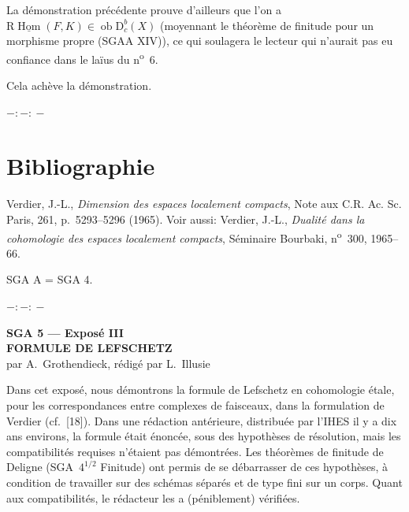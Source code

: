 \documentclass[11pt]{article}
\DeclareMathOperator{\Hom}{Hom}
\newcommand{\R}{\mathrm{R}}
\newcommand{\D}{\mathrm{D}}
\newcommand{\ob}{\operatorname{ob}}
\providecommand{\Hom}{\operatorname{Hom}}
\providecommand{\ob}{\operatorname{ob}}
\providecommand{\R}{\mathrm R}
\providecommand{\Hom}{\operatorname{Hom}}
\begin{document}
La démonstration précédente prouve d'ailleurs que l'on a $\R\underline{\Hom}(F,K)\in\ob\D_c^b(X)$ (moyennant le théorème de finitude pour un morphisme propre (SGAA XIV)), ce qui soulagera le lecteur qui n'aurait pas eu confiance dans le laïus du n\textsuperscript{o}~6.

Cela achève la démonstration.

\begin{center}
$-:\!-:\!-$
\end{center}

\section*{Bibliographie}

\begin{enumerate}[label={[\arabic*]}]
\item Verdier, J.-L., \emph{Dimension des espaces localement compacts}, Note aux C.R. Ac. Sc. Paris, 261, p.~5293--5296 (1965). Voir aussi: Verdier, J.-L., \emph{Dualité dans la cohomologie des espaces localement compacts}, Séminaire Bourbaki, n\textsuperscript{o}~300, 1965--66.
\end{enumerate}

SGA A = SGA 4.

\begin{center}
$-:\!-:\!-$
\end{center}

\clearpage
\begin{center}
{\Large \textbf{SGA 5 --- Exposé III}}\\[0.4em]
{\large \textbf{FORMULE DE LEFSCHETZ}}\\[0.3em]
par A.~Grothendieck, rédigé par L.~Illusie
\end{center}

Dans cet exposé, nous démontrons la formule de Lefschetz en cohomologie étale, pour les correspondances entre complexes de faisceaux, dans la formulation de Verdier (cf.~[18]). Dans une rédaction antérieure, distribuée par l'IHES il y a dix ans environs, la formule était énoncée, sous des hypothèses de résolution, mais les compatibilités requises n'étaient pas démontrées. Les théorèmes de finitude de Deligne (SGA~$4^{1/2}$ Finitude) ont permis de se débarrasser de ces hypothèses, à condition de travailler sur des schémas séparés et de type fini sur un corps. Quant aux compatibilités, le rédacteur les a (péniblement) vérifiées.
\end{document}
